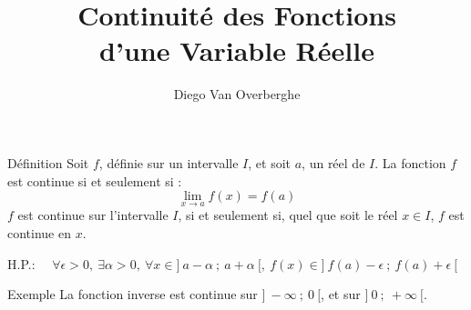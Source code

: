 \documentclass{cours}
\title{Continuité des Fonctions \\ d'une Variable Réelle}
\author{Diego Van Overberghe}
\begin{document}

    \begin{Gpartie}{Définition}
        Soit $f$, définie sur un intervalle $I$, et soit $a$, un réel de $I$.
        La fonction $f$ est continue si et seulement si : \[\boxed{\lim_{x \to a} f(x)=f(a)}\]
        $f$ est continue sur l'intervalle $I$, si et seulement si, quel que soit le réel $x\in I$, $f$ est continue en $x$.

        H.P.: $\quad\forall\epsilon >0,~\exists\alpha >0,~\forall x\in\big]~a-\alpha~;~a+\alpha~\big[,~f(x)\in\big]~f(a)-\epsilon~;~f(a)+\epsilon~\big[$
        \begin{Spartie}{Exemple}
            La fonction inverse est continue sur $\big]~-\infty~;~0~\big[$, et sur $\big]~0~;~+\infty~\big[$.


\end{Spartie}
\end{Gpartie}
\end{document}

